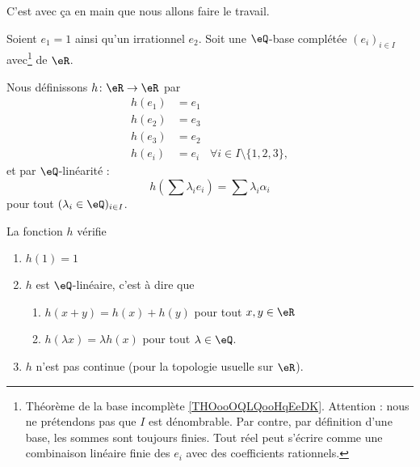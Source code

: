 C'est avec ça en main que nous allons faire le travail.

\begin{proposition}
	Soient \( e_1=1\) ainsi qu'un irrationnel \( e_2\). Soit une \( \eQ\)-base complétée \( (e_i)_{i\in I}\) avec\footnote{Théorème de la base incomplète \ref{THOooOQLQooHqEeDK}. Attention : nous ne prétendons pas que \( I\) est dénombrable. Par contre, par définition d'une base, les sommes sont toujours finies. Tout réel peut s'écrire comme une combinaison linéaire finie des \( e_i\) avec des coefficients rationnels.} de \( \eR\).

	Nous définissons \( h\colon \eR\to \eR\) par
	\begin{subequations}
		\begin{align}
			h(e_1) & =e_1                                       \\
			h(e_2) & =e_3                                       \\
			h(e_3) & =e_2                                       \\
			h(e_i) & =e_i & \forall i\in I\setminus\{ 1,2,3 \},
		\end{align}
	\end{subequations}
	et par \( \eQ\)-linéarité :
	\begin{equation}
		h(\sum \lambda_i e_i) = \sum \lambda_i \alpha_i
	\end{equation}
	pour tout \( (\lambda_i\in \eQ)_{i\in I}\).

	La fonction \( h\) vérifie
	\begin{enumerate}
		\item       \label{ITEMooOXXMooJFSuuN}
		      \( h(1)=1\)
		\item
		      \( h\) est \( \eQ\)-linéaire, c'est à dire que
		      \begin{enumerate}
			      \item   \label{ITEMooAVNMooEsodLR}
			            \( h(x+y)=h(x)+h(y)\) pour tout \( x,y\in \eR\)
			      \item       \label{ITEMooDEJMooXtvrgi}
			            \( h(\lambda x)=\lambda h(x)\) pour tout \( \lambda\in \eQ\).
		      \end{enumerate}
		\item       \label{ITEMooMHNZooBHQywD}
		      \( h\) n'est pas continue (pour la topologie usuelle sur \( \eR\)).
	\end{enumerate}
\end{proposition}

